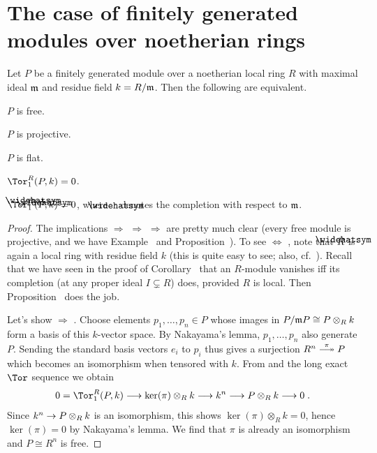 \documentclass[a4paper,parskip=half,numbers=enddot, DIV=12]{scrreprt}
\begin{document}
\section{The case of finitely generated modules over noetherian rings}
\begin{prop}
	Let $P$ be a finitely generated module over a noetherian local ring $R$ with maximal ideal $\mathfrak{m}$ and residue field $k=R/\mathfrak{m}$. Then the following are equivalent.
	\begin{alphanumerate}
		\item $P$ is free.
		\item $P$ is projective.
		\item $P$ is flat.
		\item $\Tor_1^R(P,k)=0$.
		\item $\Tor_1^{\roof{R}}(\roof{P},k)=0$, where $\roof{\phantom{x}}$ denotes the completion with respect to $\mathfrak{m}$.
	\end{alphanumerate}
\end{prop}
\begin{proof}
	The implications  $\Rightarrow$  $\Rightarrow$  $\Rightarrow$  are pretty much clear (every free module is projective, and we have Example~ and Proposition~). To see  $\Leftrightarrow$ , note that $\roof{R}$ is again a local ring with residue field $k$ (this is quite easy to see; also, cf.\ \cite[p.~192]{eisenbudCommAlg}). Recall that we have seen in the proof of Corollary~ that an $R$-module vanishes iff its completion (at any proper ideal $I\subsetneq R$) does, provided $R$ is local. Then Proposition~ does the job.
	
	Let's show  $\Rightarrow$ . Choose elements $p_1,\ldots,p_n\in P$ whose images in $P/\mathfrak{m} P\cong P\otimes_Rk$ form a basis of this $k$-vector space. By Nakayama's lemma, $p_1,\ldots,p_n$ also generate $P$. Sending the standard basis vectors $e_i$ to $p_i$ thus gives a surjection $R^n\epimorphism[\pi]P$ which becomes an isomorphism when tensored with $k$. From  and the long exact $\Tor$ sequence we obtain
	\begin{align*}
		0=\Tor_1^R(P,k)\morphism \ker(\pi)\otimes_Rk\morphism k^n\morphism P\otimes_Rk\morphism 0\;.
	\end{align*} 
	Since $k^n\morphism P\otimes_Rk$ is an isomorphism, this shows $\ker(\pi)\otimes_Rk=0$, hence $\ker(\pi)=0$ by Nakayama's lemma. We find that $\pi$ is already an isomorphism and $P\cong R^n$ is free.
\end{proof}
\end{document}
